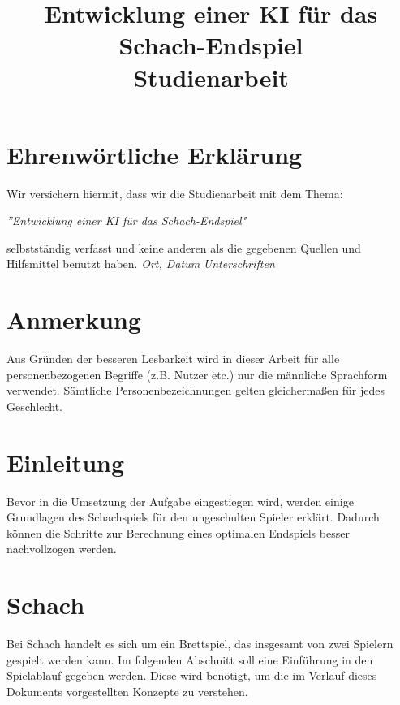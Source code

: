 \documentclass[a4paper,12pt]{article}
\title{Entwicklung einer KI für das Schach-Endspiel \\ Studienarbeit}
\begin{document}
	\setcounter{page}{2}
	\section*{Ehrenwörtliche Erklärung}
	Wir versichern hiermit, dass wir die Studienarbeit mit dem Thema:
	\begin{flushleft}
		\textit{''Entwicklung einer KI für das Schach-Endspiel"}
	\end{flushleft}
	selbstständig verfasst und keine anderen als die gegebenen Quellen und Hilfsmittel benutzt haben. \tab
	\linebreak
	\linebreak
	\linebreak
	\underline{\qquad \qquad \qquad \qquad \qquad \qquad } 
	\qquad \qquad \qquad \qquad 
	\underline{\qquad \qquad \qquad \qquad \qquad \qquad } \tab
	\linebreak
	\textit{Ort, Datum} 
	\qquad \qquad \qquad \qquad \qquad \qquad \qquad \quad 
	\textit{Unterschriften}
    \pagebreak

    \listoffigures
	\section*{Anmerkung}
	Aus Gründen der besseren Lesbarkeit wird in dieser Arbeit für alle personenbezogenen Begriffe (z.B. Nutzer etc.) nur die männliche Sprachform verwendet. Sämtliche Personenbezeichnungen gelten gleichermaßen für jedes Geschlecht.
    \pagebreak
    \tableofcontents
    \pagebreak
    \hypertarget{einleitung}{%
\section{Einleitung}\label{einleitung}}

    Bevor in die Umsetzung der Aufgabe eingestiegen wird, werden einige
Grundlagen des Schachspiels für den ungeschulten Spieler erklärt.
Dadurch können die Schritte zur Berechnung eines optimalen Endspiels
besser nachvollzogen werden.

    \hypertarget{schach}{%
\section{Schach}\label{schach}}

    Bei Schach handelt es sich um ein Brettspiel, das insgesamt von zwei
Spielern gespielt werden kann. Im folgenden Abschnitt soll eine
Einführung in den Spielablauf gegeben werden. Diese wird benötigt, um
die im Verlauf dieses Dokuments vorgestellten Konzepte zu verstehen.
\end{document}
